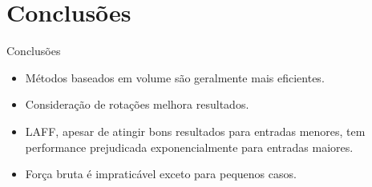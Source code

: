 \documentclass{beamer}
\begin{document}
\section{Conclusões}
\begin{frame}{Conclusões}
	\begin{itemize}
		\item Métodos baseados em volume são geralmente mais eficientes.
		\item Consideração de rotações melhora resultados.
		\item LAFF, apesar de atingir bons resultados para entradas menores, tem performance prejudicada exponencialmente para entradas maiores.
		\item Força bruta é impraticável exceto para pequenos casos.
	\end{itemize}
\end{frame}
\end{document}
